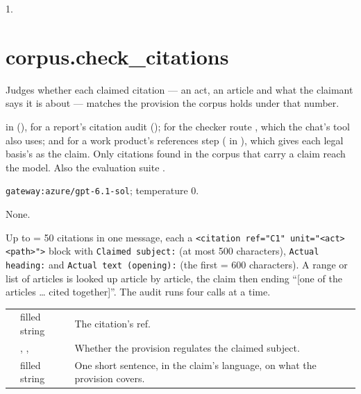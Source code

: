  1.


\section{corpus.check\_citations}\label{sec:aprompts:corpus-check_citations}

 Judges whether each claimed citation --- an act, an article and what
the claimant says it is about --- matches the provision the corpus holds under that number.

  in  (),
for a report's citation audit (); for the checker route
, which the chat's  tool also
uses; and for a work product's references step ( in
), which gives each legal basis's  as the claim. Only
citations found in the corpus that carry a claim reach the model. Also the evaluation suite
.

 \texttt{gateway:azure/gpt-6.1-sol}; temperature 0.

 None.

 Up to  = 50 citations in one message,
each a \texttt{<citation ref="C1" unit="<act> <path>">} block with \texttt{Claimed subject:} (at
most 500 characters), \texttt{Actual heading:} and \texttt{Actual text (opening):} (the first
 = 600 characters). A range or list of articles is looked up article by
article, the claim then ending \enquote{[one of the articles … cited together]}. The audit
runs four calls at a time.

\par\nopagebreak
\begin{xltabular}{\textwidth}{@{}L{38mm}L{40mm}Y@{}}
\toprule
{} &  &  \\
\midrule
\endhead
\bottomrule
\endlastfoot
{} & filled string & The citation's ref. \\
 & , ,  & Whether the provision regulates the claimed subject. \\
 & filled string & One short sentence, in the claim's language, on what the provision covers. \\
\end{xltabular}

